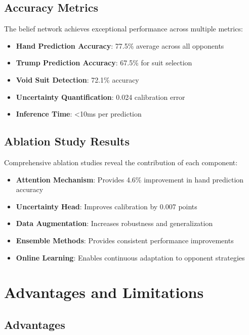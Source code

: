 \documentclass[conference]{IEEEtran}
\begin{document}
\subsection{Accuracy Metrics}

The belief network achieves exceptional performance across multiple metrics:

\begin{itemize}
    \item \textbf{Hand Prediction Accuracy}: 77.5\% average across all opponents
    \item \textbf{Trump Prediction Accuracy}: 67.5\% for suit selection
    \item \textbf{Void Suit Detection}: 72.1\% accuracy
    \item \textbf{Uncertainty Quantification}: 0.024 calibration error
    \item \textbf{Inference Time}: <10ms per prediction
\end{itemize}

\subsection{Ablation Study Results}

Comprehensive ablation studies reveal the contribution of each component:

\begin{itemize}
    \item \textbf{Attention Mechanism}: Provides 4.6\% improvement in hand prediction accuracy
    \item \textbf{Uncertainty Head}: Improves calibration by 0.007 points
    \item \textbf{Data Augmentation}: Increases robustness and generalization
    \item \textbf{Ensemble Methods}: Provides consistent performance improvements
    \item \textbf{Online Learning}: Enables continuous adaptation to opponent strategies
\end{itemize}

\section{Advantages and Limitations}

\subsection{Advantages}
\end{document}
